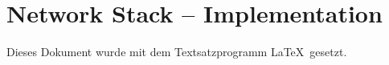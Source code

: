 \documentclass[%
	ngerman         %
	,oneside        %
	,BCOR=1cm       %
	,paper=a4       %
	,pagesize=auto  %
	,listof=totoc   %
	,index=totoc    %
	,bibliography=totoc %
	,11pt           %
	]{scrbook}
\begin{document}
	\frontmatter
	


	

	\bgroup
		\clearpage
		\renewcommand{\clearpage}{\relax}
		\tableofcontents

		\listoffigures

		\listoftables
	\egroup

	

	\mainmatter
	
	


	\chapter{Network Stack -- Implementation}
	\label{sec:ns}
	
	


	

	\appendix
	
	
	

	\backmatter
	\printbibliography

	

	\thispagestyle{empty}
	Dieses Dokument wurde mit dem Textsatzprogramm \LaTeX\ gesetzt.
\end{document}
